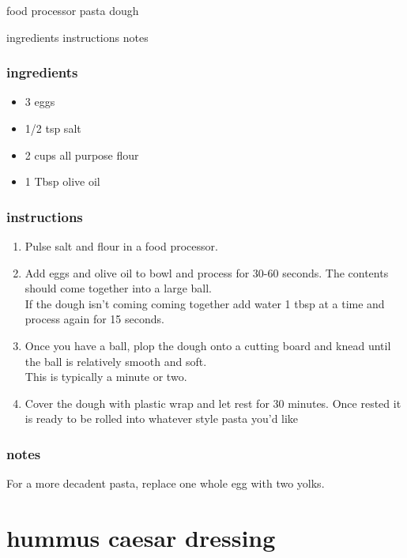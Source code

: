 \documentclass[]{book}
\providecommand{\tightlist}{%
  \setlength{\itemsep}{0pt}\setlength{\parskip}{0pt}}
\begin{document}
food processor pasta dough

ingredients \textbar{}
instructions \textbar{}
notes

\hypertarget{ingredients-25}{%
\subsection{ingredients}\label{ingredients-25}}

\begin{itemize}
\tightlist
\item
  3 eggs
\item
  1/2 tsp salt
\item
  2 cups all purpose flour
\item
  1 Tbsp olive oil
\end{itemize}

\hypertarget{instructions-25}{%
\subsection{instructions}\label{instructions-25}}

\begin{enumerate}
\def\labelenumi{\arabic{enumi}.}
\tightlist
\item
  Pulse salt and flour in a food processor.
\item
  Add eggs and olive oil to bowl and process for 30-60 seconds. The contents should come together into a large ball.\\
  If the dough isn't coming coming together add water 1 tbsp at a time and process again for 15 seconds.
\item
  Once you have a ball, plop the dough onto a cutting board and knead until the ball is relatively smooth and soft.\\
  This is typically a minute or two.
\item
  Cover the dough with plastic wrap and let rest for 30 minutes. Once rested it is ready to be rolled into whatever style pasta you'd like
\end{enumerate}

\hypertarget{notes-25}{%
\subsection{notes}\label{notes-25}}

For a more decadent pasta, replace one whole egg with two yolks.

\hypertarget{hummus-caesar-dressing}{%
\chapter{hummus caesar dressing}\label{hummus-caesar-dressing}}
\end{document}
